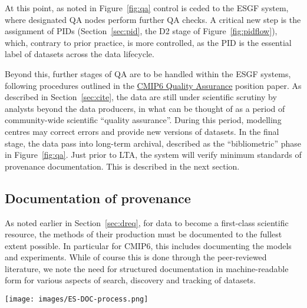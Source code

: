 \documentclass[gmd,manuscript]{copernicus}
\newcommand{\figref}[1] {\mbox{Figure   \ref{fig:#1}}}
\newcommand{\secref}[1] {\mbox{Section  \ref{sec:#1}}}
\begin{document}
At this point, as noted in \figref{qa} control is ceded to the ESGF
system, where designated QA nodes perform further QA checks. A
critical new step is the assignment of PIDs (\secref{pid}, the D2
stage of \figref{pidflow}), which, contrary to prior practice, is more
controlled, as the PID is the essential label of datasets across the
data lifecycle.

Beyond this, further stages of QA are to be handled within the ESGF
systems, following procedures outlined in the
\href{https://goo.gl/vKmGM4}{CMIP6 Quality Assurance} position paper.
As described in \secref{cite}, the data are still under scientific
scrutiny by analysts beyond the data producers, in what can be thought
of as a period of community-wide scientific ``quality assurance''.
During this period, modelling centres may correct errors and provide new
versions of datasets. In the final stage, the data pass into long-term
archival, described as the ``bibliometric'' phase in \figref{qa}. Just
prior to LTA, the system will verify minimum standards of
provenance documentation. This is described in the next section.

\subsection{Documentation of provenance}
\label{sec:doc}

As noted earlier in \secref{dreq}, for data to become a first-class
scientific resource, the methods of their production must be documented
to the fullest extent possible. In particular for CMIP6, this includes
documenting the models and experiments. While of course this is done
through the peer-reviewed literature, we note the need for structured
documentation in machine-readable form for various aspects of search,
discovery and tracking of datasets.

\begin{figure*}
  \begin{center}
    \texttt{[image: images/ES-DOC-process.png]}
  \end{center}
  \caption{Flowchart of ES-DOC documentation process, delineating
    sequence of events and indicating the parties responsible for
    producing the documentation. Figure courtesy Eric Guilyardi and
    Mark Greenslade.}
  \label{fig:esdoc}
\end{figure*}
\end{document}
